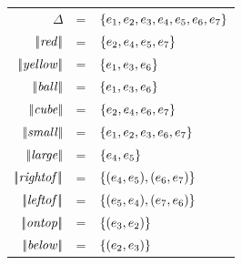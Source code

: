 \begin{figure}
\begin{flushleft}
\begin{tabular}{rcl}
$\Delta$              & = & $\{e_1,e_2,e_3,e_4,e_5,e_6,e_7\}$\\
$|\!|\mathit{red}|\!|$      & = & $\{e_2,e_4,e_5,e_7\}$\\
$|\!|\mathit{yellow}|\!|$   & = & $\{e_1,e_3,e_6\}$\\
$|\!|\mathit{ball}|\!|$     & = & $\{e_1,e_3,e_6\}$\\
$|\!|\mathit{cube}|\!|$     & = & $\{e_2,e_4,e_6,e_7\}$\\

$|\!|\mathit{small}|\!|$    & = & $\{e_1,e_2,e_3,e_6,e_7\}$\\
$|\!|\mathit{large}|\!|$    & = & $\{e_4,e_5\}$\\

$|\!|\mathit{rightof}|\!|$   & = & $\{(e_4,e_5),(e_6,e_7)\}$\\
$|\!|\mathit{leftof}|\!|$    & = & $\{(e_5,e_4),(e_7,e_6)\}$\\
$|\!|\mathit{ontop}|\!|$     & = & $\{(e_3,e_2)\}$\\
$|\!|\mathit{below}|\!|$     & = & $\{(e_2,e_3)\}$\\


\end{tabular}
\end{flushleft}
\end{figure}
